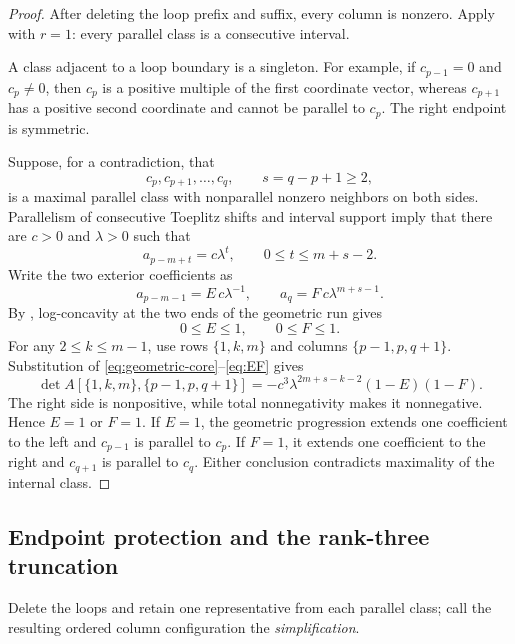 \documentclass[11pt]{amsart}
\theoremstyle{definition}
\theoremstyle{remark}
\begin{document}
\begin{proof}
After deleting the loop prefix and suffix, every column is nonzero.  Apply  with $r=1$: every parallel class is a consecutive interval.

A class adjacent to a loop boundary is a singleton.  For example, if $c_{p-1}=0$ and $c_p\ne0$, then $c_p$ is a positive multiple of the first coordinate vector, whereas $c_{p+1}$ has a positive second coordinate and cannot be parallel to $c_p$.  The right endpoint is symmetric.

Suppose, for a contradiction, that
\[
 c_p,c_{p+1},\ldots,c_q,
 \qquad s=q-p+1\ge2,
\]
is a maximal parallel class with nonparallel nonzero neighbors on both sides.  Parallelism of consecutive Toeplitz shifts and interval support imply that there are $c>0$ and $\lambda>0$ such that
\begin{equation}\label{eq:geometric-core}
 a_{p-m+t}=c\lambda^t,
 \qquad 0\le t\le m+s-2.
\end{equation}
Write the two exterior coefficients as
\begin{equation}\label{eq:EF}
 a_{p-m-1}=E\,c\lambda^{-1},
 \qquad
 a_q=F\,c\lambda^{m+s-1}.
\end{equation}
By , log-concavity at the two ends of the geometric run gives
\[
 0\le E\le1,
 \qquad 0\le F\le1.
\]
For any $2\le k\le m-1$, use rows $\{1,k,m\}$ and columns $\{p-1,p,q+1\}$.  Substitution of \eqref{eq:geometric-core}--\eqref{eq:EF} gives
\begin{equation}\label{eq:endpoint-defect}
 \det A[\{1,k,m\},\{p-1,p,q+1\}]
 =-c^3\lambda^{2m+s-k-2}(1-E)(1-F).
\end{equation}
The right side is nonpositive, while total nonnegativity makes it nonnegative.  Hence $E=1$ or $F=1$.  If $E=1$, the geometric progression extends one coefficient to the left and $c_{p-1}$ is parallel to $c_p$.  If $F=1$, it extends one coefficient to the right and $c_{q+1}$ is parallel to $c_q$.  Either conclusion contradicts maximality of the internal class.
\end{proof}

\subsection{Endpoint protection and the rank-three truncation}

Delete the loops and retain one representative from each parallel class; call the resulting ordered column configuration the \emph{simplification}.
\end{document}

